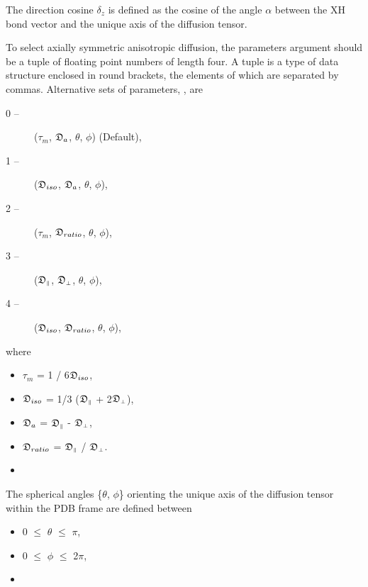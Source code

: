  The direction cosine $\delta_z$ is defined as the cosine of the angle $\alpha$ between the XH bond vector and the unique axis of the diffusion tensor. 
  

 To select axially symmetric anisotropic diffusion, the parameters argument should be a tuple of floating point numbers of length four.  A tuple is a type of data structure enclosed in round brackets, the elements of which are separated by commas.  Alternative sets of parameters, , are 
  

 \begin{description} 
 \item[0 --]  ($\tau_m$, $\mathfrak{D}_a$, $\theta$, $\phi$)   (Default),  
 \item[1 --]  ($\mathfrak{D}_{iso}$, $\mathfrak{D}_a$, $\theta$, $\phi$),  
 \item[2 --]  ($\tau_m$, $\mathfrak{D}_{ratio}$, $\theta$, $\phi$),  
 \item[3 --]  ($\mathfrak{D}_{\scriptscriptstyle \parallel}$, $\mathfrak{D}_{\scriptscriptstyle \perp}$, $\theta$, $\phi$),  
 \item[4 --]  ($\mathfrak{D}_{iso}$, $\mathfrak{D}_{ratio}$, $\theta$, $\phi$),  
 \end{description} 
  

 where 
  

 \begin{itemize} 
 \item[] $\tau_m$ = 1 / 6$\mathfrak{D}_{iso}$,  
 \item[] $\mathfrak{D}_{iso}$ = 1/3 ($\mathfrak{D}_{\scriptscriptstyle \parallel}$ + 2$\mathfrak{D}_{\scriptscriptstyle \perp}$),  
 \item[] $\mathfrak{D}_a$ = $\mathfrak{D}_{\scriptscriptstyle \parallel}$ - $\mathfrak{D}_{\scriptscriptstyle \perp}$,  
 \item[] $\mathfrak{D}_{ratio}$ = $\mathfrak{D}_{\scriptscriptstyle \parallel}$ / $\mathfrak{D}_{\scriptscriptstyle \perp}$.  
 \item[]  
 \end{itemize} 
  

 The spherical angles \{$\theta$, $\phi$\} orienting the unique axis of the diffusion tensor within the PDB frame are defined between 
  

 \begin{itemize} 
 \item[] 0 $\le$ $\theta$ $\le$ $\pi$,  
 \item[] 0 $\le$ $\phi$ $\le$ 2$\pi$,  
 \item[]  
 \end{itemize} 
  

